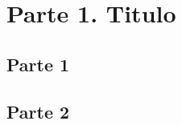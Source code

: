 \section{Parte 1. Titulo}

\subsection{Parte 1}





\clearpage 
\subsection{Parte 2}




\clearpage 

